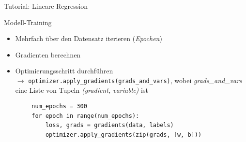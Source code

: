 \documentclass[utf8, smaller, c]{beamer}
\renewcommand{\tt}[1]{{\texttt{#1}}}
\begin{document}
\begin{frame}{Tutorial: Lineare Regression}
	\framebreak
	
	\begin{block}{Modell-Training}
	    \begin{itemize}
	        \item Mehrfach über den Datensatz iterieren (\textit{Epochen})
	        \item Gradienten berechnen
	        \item Optimierungsschritt durchführen \\$\rightarrow$ \tt{optimizer.apply\_gradients(grads\_and\_vars)}, wobei \textit{grads\_and\_vars} eine Liste von Tupeln \textit{(gradient, variable)} ist
	    \end{itemize}
	    \begin{lstlisting}
        num_epochs = 300
        for epoch in range(num_epochs):
            loss, grads = gradients(data, labels)
            optimizer.apply_gradients(zip(grads, [w, b]))
	    \end{lstlisting}
	\end{block}
	
	\framebreak
	

\end{frame}
\end{document}
